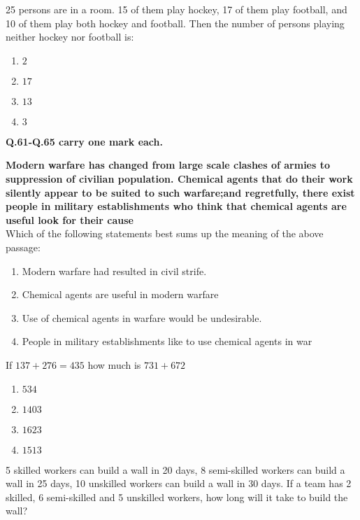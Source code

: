 \item[60)] 25 persons are in a room. 15 of them play hockey, 17 of them play football, and 10 of them play both hockey and football. Then the number of persons playing neither hockey nor football is:
\begin{multicols}{2}
\begin{enumerate}
    \item $2$
    \item $17$
    \item $13$
    \item $3$
\end{enumerate}    
\end{multicols}
\bigskip
\textbf{Q.61-Q.65 carry one mark each.}
\bigskip
\item[61)] \textbf{Modern warfare has changed from large scale clashes of armies to suppression of civilian population. Chemical agents that do their work silently appear to be suited to such warfare;and regretfully, there exist people in military establishments who think that chemical agents are useful look for their cause}
\bigskip \\
Which of the following statements best sums up the meaning of the above passage:
\begin{enumerate}
    \item Modern warfare had resulted in civil strife.
    \item Chemical agents are useful in modern warfare
    \item Use of chemical agents in warfare would be undesirable.
    \item People in military establishments like to use chemical agents in war
\end{enumerate}    
\item[62)] If $137+276=435$ how much is $731+672$
\begin{multicols}{2}
\begin{enumerate}
    \item $534$
    \item $1403$
    \item $1623$
    \item $1513$
\end{enumerate}    
\end{multicols}  
\item[63)] 5 skilled workers can build a wall in 20 days, 8 semi-skilled workers can build a wall in 25 days, 10 unskilled workers can build a wall in 30 days. If a team has 2 skilled, 6 semi-skilled and 5 unskilled workers, how long will it take to build the wall?
